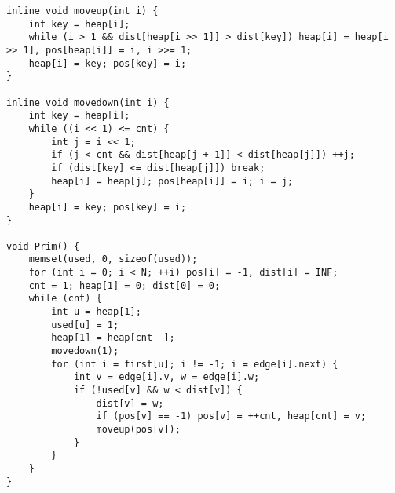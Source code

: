 \begin{verbatim}
inline void moveup(int i) {
    int key = heap[i];
    while (i > 1 && dist[heap[i >> 1]] > dist[key]) heap[i] = heap[i >> 1], pos[heap[i]] = i, i >>= 1;
    heap[i] = key; pos[key] = i;
}

inline void movedown(int i) {
    int key = heap[i];
    while ((i << 1) <= cnt) {
        int j = i << 1;
        if (j < cnt && dist[heap[j + 1]] < dist[heap[j]]) ++j;
        if (dist[key] <= dist[heap[j]]) break;
        heap[i] = heap[j]; pos[heap[i]] = i; i = j;
    }
    heap[i] = key; pos[key] = i;
}

void Prim() {
    memset(used, 0, sizeof(used));
    for (int i = 0; i < N; ++i) pos[i] = -1, dist[i] = INF;
    cnt = 1; heap[1] = 0; dist[0] = 0;
    while (cnt) {
        int u = heap[1];
        used[u] = 1;
        heap[1] = heap[cnt--];
        movedown(1);
        for (int i = first[u]; i != -1; i = edge[i].next) {
            int v = edge[i].v, w = edge[i].w;
            if (!used[v] && w < dist[v]) {
                dist[v] = w;
                if (pos[v] == -1) pos[v] = ++cnt, heap[cnt] = v;
                moveup(pos[v]);
            }
        }
    }
}
\end{verbatim}
